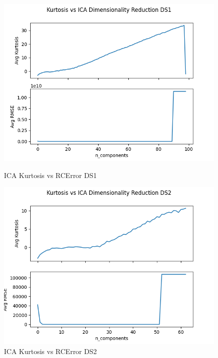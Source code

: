 \begin{figure}
    \begin{minipage}{0.5\textwidth}
        \centering
        \includegraphics[width=.9\linewidth]{icads1.png}
        \caption{ICA Kurtosis vs RCError DS1}\label{Fig:ICA DS1}
    \end{minipage}\hfill
    \begin{minipage}{0.5\textwidth}
        \centering
        \includegraphics[width=.9\linewidth]{icads2.png}
        \caption{ICA Kurtosis vs RCError DS2}\label{Fig:ICA DS2}
    \end{minipage}
\end{figure}

